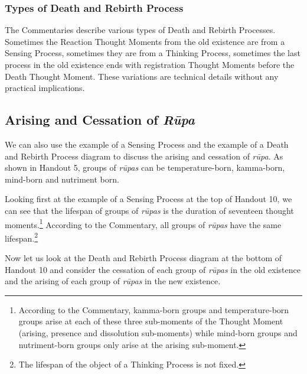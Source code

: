 \subsubsection*{Types of Death and Rebirth Process}

The Commentaries describe various types of Death and Rebirth Processes. Sometimes the Reaction Thought Moments from the old existence are from a Sensing Process, sometimes they are from a Thinking Process, sometimes the last process in the old existence ends with registration Thought Moments before the Death Thought Moment. These variations are technical details without any practical implications.

\subsection*{Arising and Cessation of \textit{Rūpa}}

We can also use the example of a Sensing Process and the example of a Death and Rebirth Process diagram to discuss the arising and cessation of \textit{rūpa}. As shown in Handout 5, groups of \textit{rūpas} can be temperature-born, kamma-born, mind-born and nutriment born.

Looking first at the example of a Sensing Process at the top of Handout 10, we can see that the lifespan of groups of \textit{rūpas} is the duration of seventeen thought moments.\footnote{According to the Commentary, kamma-born groups and temperature-born groups arise at each of these three sub-moments of the Thought Moment (arising, presence and dissolution sub-moments) while mind-born groups and nutriment-born groups only arise at the arising sub-moment.} According to the Commentary, all groups of \textit{rūpas} have the same lifespan.\footnote{The lifespan of the object of a Thinking Process is not fixed.}

Now let us look at the Death and Rebirth Process diagram at the bottom of Handout 10 and consider the cessation of each group of \textit{rūpas} in the old existence and the arising of each group of \textit{rūpas} in the new existence. 

